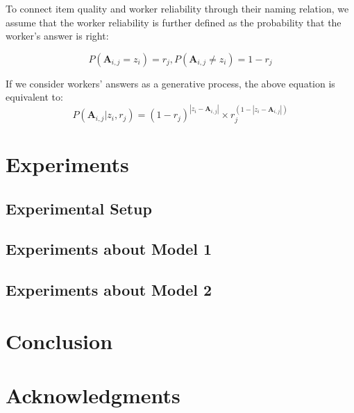 \documentclass{article}
\begin{document}
To connect item quality and worker reliability through their naming relation, we assume that the worker reliability is further defined as the probability that the worker's answer is right:

\begin{equation}
    P(\mathbf{A}_{i,j} = z_i) =  r_j, P(\mathbf{A}_{i,j} \ne z_i) = 1- r_j
\end{equation}

If we consider workers' answers as a generative process, the above equation is equivalent to:
\begin{equation}
    P(\mathbf{A}_{i,j} | z_i,  r_j) = (1- r_j)^{|z_i-\mathbf{A}_{i,j}|}\times  r_j^{(1-|z_i-\mathbf{A}_{i,j}|)}
\end{equation}



\section{Experiments}

\subsection{Experimental Setup}

\subsection{Experiments about Model 1}

\subsection{Experiments about Model 2}

\section{Conclusion}



\section*{Acknowledgments}





\end{document}
